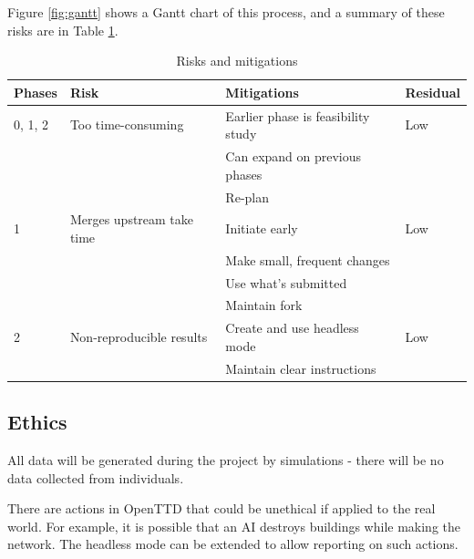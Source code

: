 \documentclass[a4paper,11pt]{article}
\begin{document}
Figure \ref{fig:gantt} shows a Gantt chart of this process, and a summary of these risks are in Table \ref{fig:risks}.

\begin{table}[htbp]
    \begin{center}
        \begin{tabular}{|l|l|l|l|}
        \hline
        \textbf{Phases} & \textbf{Risk} & \textbf{Mitigations} & \textbf{Residual} \\
        \hline
        0, 1, 2 & Too time-consuming        & Earlier phase is feasibility study & Low \\
                &                           & Can expand on previous phases      & \\
                &                           & Re-plan                            & \\
        1       & Merges upstream take time & Initiate early                     & Low \\
                &                           & Make small, frequent changes       & \\
                &                           & Use what's submitted               & \\
                &                           & Maintain fork                      & \\
        2       & Non-reproducible results  & Create and use headless mode       & Low \\
                &                           & Maintain clear instructions        & \\
        \hline
        \end{tabular} 
    \end{center}
    \caption[Risks and mitigations]{Risks and mitigations}
    \label{fig:risks}
\end{table}

\subsection{Ethics}

All data will be generated during the project by simulations - there will be no data collected from individuals.

There are actions in OpenTTD that could be unethical if applied to the real world. For example, it is possible that an AI destroys buildings while making the network. The headless mode can be extended to allow reporting on such actions.
\end{document}
